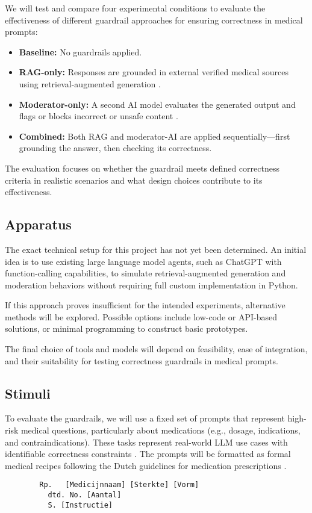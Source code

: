\documentclass[a4paper,doc,natbib]{apa6}
\begin{document}
    We will test and compare four experimental conditions to evaluate the effectiveness of different guardrail approaches for ensuring correctness in medical prompts:

    \begin{itemize}
        \item \textbf{Baseline:} No guardrails applied.
        \item \textbf{RAG-only:} Responses are grounded in external verified medical sources using retrieval-augmented generation \citep{dong2024guardrails}.
        \item \textbf{Moderator-only:} A second AI model evaluates the generated output and flags or blocks incorrect or unsafe content \citep{inan2023llamaguard}.
        \item \textbf{Combined:} Both RAG and moderator-AI are applied sequentially—first grounding the answer, then checking its correctness.
    \end{itemize}

    The evaluation focuses on whether the guardrail meets defined correctness criteria in realistic scenarios and what design choices contribute to its effectiveness.

    \subsection{Apparatus}

    The exact technical setup for this project has not yet been determined. An initial idea is to use existing large language model agents, such as ChatGPT with function-calling capabilities, to simulate retrieval-augmented generation and moderation behaviors without requiring full custom implementation in Python.

    If this approach proves insufficient for the intended experiments, alternative methods will be explored. Possible options include low-code or API-based solutions, or minimal programming to construct basic prototypes.

    The final choice of tools and models will depend on feasibility, ease of integration, and their suitability for testing correctness guardrails in medical prompts.

    \subsection{Stimuli}

    To evaluate the guardrails, we will use a fixed set of prompts that represent high-risk medical questions, particularly about medications (e.g., dosage, indications, and contraindications).
    These tasks represent real-world LLM use cases with identifiable correctness constraints \citep{pais2024medication}.
    The prompts will be formatted as formal medical recipes following the Dutch guidelines for medication prescriptions \citep{farmacotherapeutischkompas}.
    \begin{verbatim}
        Rp.   [Medicijnnaam] [Sterkte] [Vorm]
          dtd. No. [Aantal]
          S. [Instructie]
    \end{verbatim}
\end{document}
